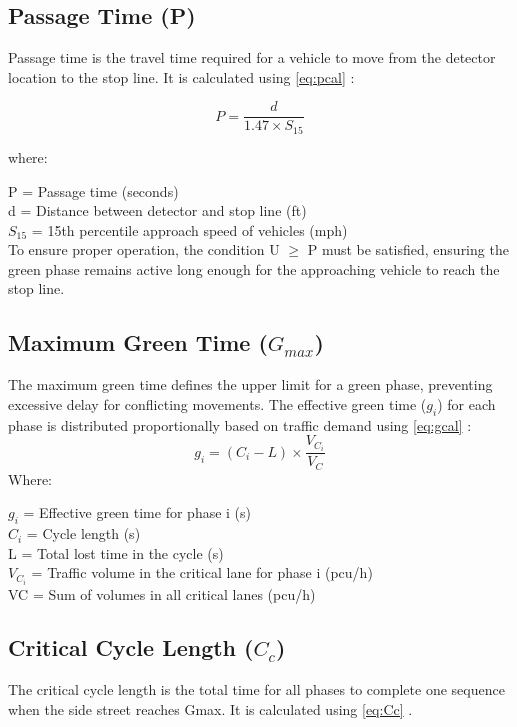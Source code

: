  \subsection{Passage Time (P)}
Passage time is the travel time required for a vehicle to 
move from the detector location to the stop line. It is 
calculated using \cref{eq:pcal} \cite{duraku2024}:

\begin{equation}
    P = \frac{d}{1.47 \times S_{15}}
    \label{eq:pcal}
\end{equation}


where:

P = Passage time (seconds) \\
d = Distance between detector and stop line (ft) \\
$S_{15}$ = 15th percentile approach speed of vehicles (mph) \\


To ensure proper operation, the condition U $\ge$ P must be 
satisfied, ensuring the green phase remains active long 
enough for the approaching vehicle to reach the stop line.

 \subsection{Maximum Green Time ($G_{max}$)}
 The maximum green time defines the upper limit for a green 
 phase, preventing excessive delay for conflicting movements. 
 The effective green time ($g_i$) for each phase is distributed 
 proportionally based on traffic demand using \cref{eq:gcal} \cite{duraku2024}:
 \begin{equation}
    g_i = (C_i - L) \times \frac{V_{C_i}}{V_C}
    \label{eq:gcal}
 \end{equation}
 Where:

$g_i$ = Effective green time for phase i (s) \\
$C_i$ = Cycle length (s) \\ 
L = Total lost time in the cycle (s) \\
$V_{C_i}$ = Traffic volume in the critical lane for phase i (pcu/h) \\
 VC = Sum of volumes in all critical lanes (pcu/h) \


 \subsection{Critical Cycle Length ($C_c$)}
 The critical cycle length is the total time for all phases 
 to complete one sequence when the side street reaches Gmax. 
 It is calculated using \cref{eq:Cc} \cite{duraku2024}. \\

